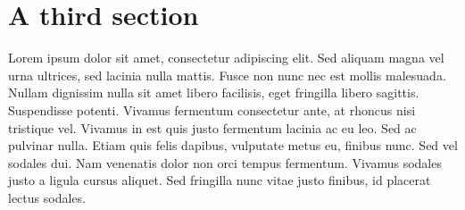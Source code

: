 \section{A third section}

Lorem ipsum dolor sit amet, consectetur adipiscing elit. Sed aliquam magna vel urna ultrices, sed lacinia nulla mattis. Fusce non nunc nec est mollis malesuada. Nullam dignissim nulla sit amet libero facilisis, eget fringilla libero sagittis. Suspendisse potenti. Vivamus fermentum consectetur ante, at rhoncus nisi tristique vel. Vivamus in est quis justo fermentum lacinia ac eu leo. Sed ac pulvinar nulla. Etiam quis felis dapibus, vulputate metus eu, finibus nunc. Sed vel sodales dui. Nam venenatis dolor non orci tempus fermentum. Vivamus sodales justo a ligula cursus aliquet. Sed fringilla nunc vitae justo finibus, id placerat lectus sodales.
